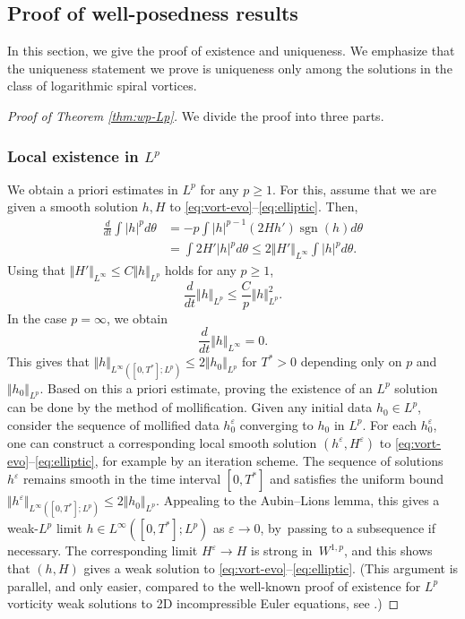 \documentclass[JEP,XML,SOM,Unicode,NoFloatCountersInSection,published]{cedram}
\theoremstyle{plain}
\theoremstyle{definition}
\newcommand{\nrm}[1]{\Vert#1\Vert}
\DeclareMathOperator{\sgn}{sgn}
\let\tht\theta
\let\varep\varepsilon
\begin{document}
\subsection{Proof of well-posedness results}

In this section, we give the proof of exis\-tence and uniqueness. We emphasize that the uniqueness statement we prove is uniqueness only among the solutions in the class of logarithmic spiral vortices.

\begin{proof}[Proof of Theorem \ref{thm:wp-Lp}]

We divide the proof into three parts.

\subsubsection{Local existence in $L^p$}
We obtain a priori estimates in $L^p$ for any $p\ge1$. For this, assume that we are given a smooth solution $h, H$ to \eqref{eq:vort-evo}--\eqref{eq:elliptic}. Then,
\begin{equation}\label{eq:drv lp norm}
\begin{split}
\frac{d}{dt} \int |h|^p d\tht &= -p \int |h|^{p-1} (2H h') \sgn(h) d\tht\\
&= \int 2H' |h|^p d\tht \le 2\nrm{H'}_{L^\infty} \int |h|^p d\tht.
\end{split}
\end{equation}
Using that $\nrm{H'}_{L^\infty} \le C\nrm{h}_{L^p}$ holds for any $p\ge1$,
\begin{equation*}
\frac{d}{dt} \nrm{h}_{L^p} \le \frac{C}{p} \nrm{h}_{L^p}^2.
\end{equation*}
In the case $p=\infty$, we obtain
\begin{equation*}
\frac{d}{dt} \nrm{h}_{L^\infty} = 0.
\end{equation*}
This gives that $\nrm{h}_{L^\infty([0,T^*];L^p)} \le 2\nrm{h_0}_{L^p}$ for $T^*>0$ depending only on $p$ and $\nrm{h_0}_{L^p}$. Based on this a priori estimate, proving the existence of an $L^p$ solution can be done by the method of mollification. Given any initial data $h_0 \in L^p$, consider the sequence of mollified data $h_0^{\varep}$ converging to $h_0$ in $L^p$. For each $h_0^\varep$, one can construct a corresponding local smooth solution $(h^\varep,H^\varep)$ to \eqref{eq:vort-evo}--\eqref{eq:elliptic}, for example by an iteration scheme. The sequence of solutions $h^\varep$ remains smooth in the time interval $[0,T^*]$ and satisfies the uniform bound $\nrm{h^\varep}_{L^\infty([0,T^*];L^p)} \le 2\nrm{h_0}_{L^p}$. Appealing to the Aubin--Lions lemma, this gives a weak-$L^p$ limit $h \in L^\infty([0,T^*];L^p)$ as $\varep\to0$, by~passing to a subsequence if necessary. The corresponding limit $H^\varep\to H$ is strong in~$W^{1,p}$, and this shows that $(h,H)$ gives a weak solution to \eqref{eq:vort-evo}--\eqref{eq:elliptic}. (This argument is parallel, and only easier, compared to the well-known proof of existence for $L^p$ vorticity weak solutions to 2D incompressible Euler equations, see \cite{MB}.)


\end{proof}
\end{document}
